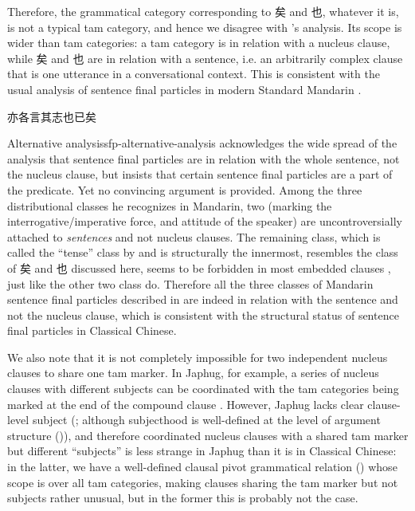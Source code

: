 \documentclass[UTF8, a4paper, oneside, scheme=plain, 12pt]{ctexrep}
\newcommand*{\citesec}[1]{\S~{#1}}
\newcommand*{\citepage}[1]{p.~{#1}}
\newcommand*{\citepages}[1]{pp.~{#1}}
\begin{document}
Therefore, the grammatical category corresponding to 矣 and 也, whatever it is,
is not a typical \ac{tam} category,
and hence we disagree with \citet{meiguang2018}'s analysis.
Its scope is wider than \ac{tam} categories:
a \ac{tam} category is in relation with a nucleus clause,
while 矣 and 也 are in relation with a sentence,
i.e. an arbitrarily complex clause that is one utterance in a conversational context.
This is consistent with the usual analysis of sentence final particles 
in modern Standard Mandarin
\citep{paul2014particles,pan2021sentence}.

\begin{exe}
    \ex 亦各言其志也已矣
\end{exe}

\begin{infobox}{Alternative analysis}{sfp-alternative-analysis}
    \citet[\citepage{233}]{zhudexigrammar} acknowledges the wide spread of the analysis that sentence final particles are in relation with the whole sentence, not the nucleus clause,
    but insists that certain sentence final particles are a part of the predicate.
    Yet no convincing argument is provided.
    Among the three distributional classes he recognizes in Mandarin,
    two (marking the interrogative/imperative force, and attitude of the speaker)
    are uncontroversially attached to \emph{sentences} and not nucleus clauses.
    The remaining class, which is called the ``tense'' class by \citet{zhudexigrammar}
    and is structurally the innermost,
    resembles the class of 矣 and 也 discussed here,
    seems to be forbidden in most embedded clauses \citep{deng2010},
    just like the other two class do.
    Therefore all the three classes of Mandarin sentence final particles described in \citet{zhudexigrammar}
    are indeed in relation with the sentence and not the nucleus clause,
    which is consistent with the structural status of sentence final particles in Classical Chinese.
    
    We also note that it is not completely impossible for two independent nucleus clauses to share one \ac{tam} marker.
    In Japhug, for example, a series of nucleus clauses with different subjects can be coordinated with the \ac{tam} categories being marked at the end of the compound clause \citep[\citepages{1090-1091}]{jacques2021grammar}.
    However, Japhug lacks clear clause-level subject
    (\citealt[\citesec{2.5.3}]{jacques2021grammar}; although subjecthood is well-defined at the level of argument structure ()),
    and therefore coordinated nucleus clauses with a shared \ac{tam} marker but different ``subjects'' is less strange in Japhug than it is in Classical Chinese:
    in the latter, we have a well-defined clausal pivot grammatical relation () whose scope is over all \ac{tam} categories,
    making clauses sharing the \ac{tam} marker but not subjects rather unusual,
    but in the former this is probably not the case.


\end{infobox}
\end{document}
